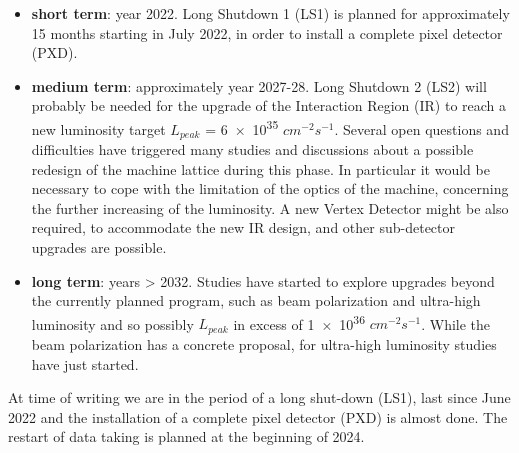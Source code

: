 \begin{itemize}
\item \textbf{short term}: year 2022. Long Shutdown 1 (LS1) is planned for approximately 15 months starting in July 2022, in order to install a complete pixel detector (PXD).
\item \textbf{medium term}: approximately year 2027-28. Long Shutdown 2 (LS2) will probably be needed for the upgrade of the Interaction Region (IR) to reach a new luminosity target $\textit{L}_{peak}$ = \num{6e35} $cm^{-2}s^{-1}$. 
Several open questions and difficulties have triggered many studies and discussions about a possible redesign of the machine lattice during this phase. In particular it would be necessary to cope with the limitation of the optics of the machine, concerning the further increasing of the luminosity. A new Vertex Detector might be also required, to accommodate the new IR design, and other sub-detector upgrades are possible. 
\item \textbf{long term}: years > 2032. Studies have started to explore upgrades beyond the currently planned program, such as beam polarization and ultra-high luminosity and so possibly $\textit{L}_{peak}$ in excess of \num{1e36} $cm^{-2}s^{-1}$. While the beam polarization has a concrete proposal, for ultra-high luminosity studies have just started.
\end{itemize}

At time of writing we are in the period of a long shut-down (LS1), last since June 2022 and the installation of a complete pixel detector (PXD) is almost done. The restart of data taking is planned at the beginning of 2024.


\begin{comment}

Therefore a program has been drawn up and at time of writing we are in the period of a long shut-down (LS1), last since June 2022. It is planned for approximately 15 months in order to install a complete pixel detector (PXD), which is almost done. The restart of data taking is planned at the beginning of 2024. 


\end{comment}










